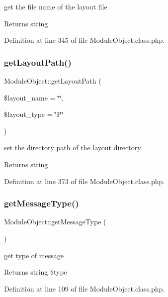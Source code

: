 get the file name of the layout file \begin{DoxyReturn}{Returns}
string 
\end{DoxyReturn}


Definition at line 345 of file Module\+Object.\+class.\+php.

\hypertarget{classModuleObject_ad3f6b56ddff1e52a49015771d0a08336}{}\label{classModuleObject_ad3f6b56ddff1e52a49015771d0a08336} 
\subsubsection{\texorpdfstring{get\+Layout\+Path()}{getLayoutPath()}}
{\footnotesize\ttfamily Module\+Object\+::get\+Layout\+Path (\begin{DoxyParamCaption}\item[{}]{\$layout\+\_\+name = {\ttfamily \char`\"{}\char`\"{}},  }\item[{}]{\$layout\+\_\+type = {\ttfamily \char`\"{}P\char`\"{}} }\end{DoxyParamCaption})}

set the directory path of the layout directory \begin{DoxyReturn}{Returns}
string 
\end{DoxyReturn}


Definition at line 373 of file Module\+Object.\+class.\+php.

\hypertarget{classModuleObject_aa0c2daa9dda892df56eb5fe7c754e25b}{}\label{classModuleObject_aa0c2daa9dda892df56eb5fe7c754e25b} 
\subsubsection{\texorpdfstring{get\+Message\+Type()}{getMessageType()}}
{\footnotesize\ttfamily Module\+Object\+::get\+Message\+Type (\begin{DoxyParamCaption}{ }\end{DoxyParamCaption})}

get type of message \begin{DoxyReturn}{Returns}
string \$type 
\end{DoxyReturn}


Definition at line 109 of file Module\+Object.\+class.\+php.

